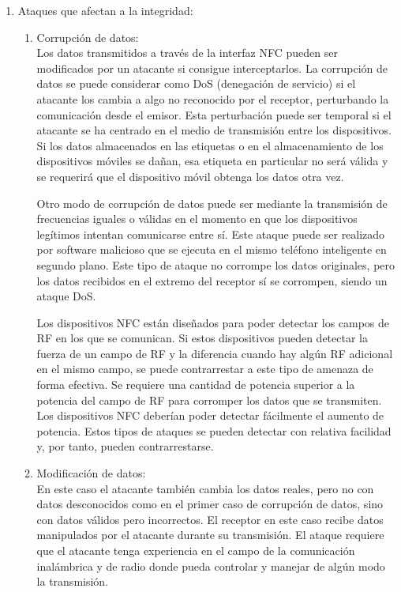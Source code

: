\documentclass[12pt,a4paper,onecolumn,oneside]{report}
\begin{document}
\begin{enumerate}
\begin{enumerate}
\end{enumerate}

\item Ataques que afectan a la integridad:\\
\begin{enumerate}

\item Corrupción de datos:\\
Los datos transmitidos a través de la interfaz NFC pueden ser modificados por un atacante si consigue interceptarlos. La corrupción de datos se puede considerar como DoS (denegación de servicio) si el atacante los cambia a algo no reconocido por el receptor, perturbando la comunicación desde el emisor. Esta perturbación puede ser temporal si el atacante se ha centrado en el medio de transmisión entre los dispositivos. Si los datos almacenados en las etiquetas o en el almacenamiento de los dispositivos móviles se dañan, esa etiqueta en particular no será válida y se requerirá que el dispositivo móvil obtenga los datos otra vez.

Otro modo de corrupción de datos puede ser mediante la transmisión de frecuencias iguales o válidas en el momento en que los dispositivos legítimos intentan comunicarse entre sí. Este ataque puede ser realizado por software malicioso que se ejecuta en el mismo teléfono inteligente en segundo plano. Este tipo de ataque no corrompe los datos originales, pero los datos recibidos en el extremo del receptor sí se corrompen, siendo un ataque DoS. 

Los dispositivos NFC están diseñados para poder detectar los campos de RF en los que se comunican. Si estos dispositivos pueden detectar la fuerza de un campo de RF y la diferencia cuando hay algún RF adicional en el mismo campo, se puede contrarrestar a este tipo de amenaza de forma efectiva. Se requiere una cantidad de potencia superior a la potencia del campo de RF para corromper los datos que se transmiten. Los dispositivos NFC deberían poder detectar fácilmente el aumento de potencia. Estos tipos de ataques se pueden detectar con relativa facilidad y, por tanto, pueden contrarrestarse.

\item Modificación de datos:\\
En este caso el atacante también cambia los datos reales, pero no con datos desconocidos como en el primer caso de corrupción de datos, sino con datos válidos pero incorrectos. El receptor en este caso recibe datos manipulados por el atacante durante su transmisión. El ataque requiere que el atacante tenga experiencia en el campo de la comunicación inalámbrica y de radio donde pueda controlar y manejar de algún modo la transmisión.


\end{enumerate}
\end{enumerate}
\end{document}
